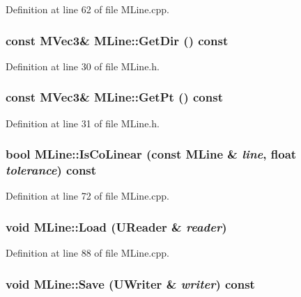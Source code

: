 Definition at line 62 of file MLine.cpp.\hypertarget{class_m_line_376cbeab71b3d281f7bde73b610ee820}{
\subsubsection[{GetDir}]{\setlength{\rightskip}{0pt plus 5cm}const {\bf MVec3}\& MLine::GetDir () const}}
\label{class_m_line_376cbeab71b3d281f7bde73b610ee820}




Definition at line 30 of file MLine.h.\hypertarget{class_m_line_218c7222844e18938f4f928fbb15135a}{
\subsubsection[{GetPt}]{\setlength{\rightskip}{0pt plus 5cm}const {\bf MVec3}\& MLine::GetPt () const}}
\label{class_m_line_218c7222844e18938f4f928fbb15135a}




Definition at line 31 of file MLine.h.\hypertarget{class_m_line_2efbe33d2c8a438be9fb6ea44368165e}{
\subsubsection[{IsCoLinear}]{\setlength{\rightskip}{0pt plus 5cm}bool MLine::IsCoLinear (const {\bf MLine} \& {\em line}, \/  float {\em tolerance}) const}}
\label{class_m_line_2efbe33d2c8a438be9fb6ea44368165e}




Definition at line 72 of file MLine.cpp.\hypertarget{class_m_line_b0eb935747cb7dda550bfdcb4f67c535}{
\subsubsection[{Load}]{\setlength{\rightskip}{0pt plus 5cm}void MLine::Load ({\bf UReader} \& {\em reader})}}
\label{class_m_line_b0eb935747cb7dda550bfdcb4f67c535}




Definition at line 88 of file MLine.cpp.\hypertarget{class_m_line_fb250ec3be9ab81f80de8b23d9859106}{
\subsubsection[{Save}]{\setlength{\rightskip}{0pt plus 5cm}void MLine::Save ({\bf UWriter} \& {\em writer}) const}}
\label{class_m_line_fb250ec3be9ab81f80de8b23d9859106}




